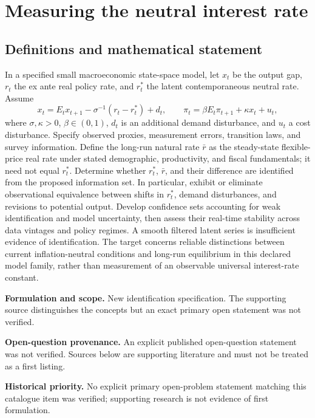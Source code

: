 \documentclass[11pt]{article}
\begin{document}
\section*{Measuring the neutral interest rate}\label{30007526}
\subsection{Definitions and mathematical statement}
In a specified small macroeconomic state-space model, let \(x_t\) be the output gap, \(r_t\) the ex ante real policy rate, and \(r_t^*\) the latent contemporaneous neutral rate. Assume
\[
x_t=E_tx_{t+1}-\sigma^{-1}(r_t-r_t^*)+d_t,\qquad
\pi_t=\beta E_t\pi_{t+1}+\kappa x_t+u_t,
\]
where \(\sigma,\kappa>0\), \(\beta\in(0,1)\), \(d_t\) is an additional demand disturbance, and \(u_t\) a cost disturbance. Specify observed proxies, measurement errors, transition laws, and survey information. Define the long-run natural rate \(\bar r\) as the steady-state flexible-price real rate under stated demographic, productivity, and fiscal fundamentals; it need not equal \(r_t^*\).
Determine whether \(r_t^*\), \(\bar r\), and their difference are identified from the proposed information set. In particular, exhibit or eliminate observational equivalence between shifts in \(r_t^*\), demand disturbances, and revisions to potential output. Develop confidence sets accounting for weak identification and model uncertainty, then assess their real-time stability across data vintages and policy regimes. A smooth filtered latent series is insufficient evidence of identification. The target concerns reliable distinctions between current inflation-neutral conditions and long-run equilibrium in this declared model family, rather than measurement of an observable universal interest-rate constant.

\par\textbf{Formulation and scope.} New identification specification. The supporting source distinguishes the concepts but an exact primary open statement was not verified.

\par\textbf{Open-question provenance.} An explicit published open-question statement was not verified. Sources below are supporting literature and must not be treated as a first listing.

\par\textbf{Historical priority.} No explicit primary open-problem statement matching this catalogue item was verified; supporting research is not evidence of first formulation.
\end{document}
